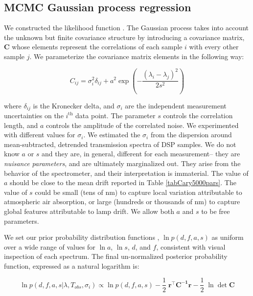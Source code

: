 \documentclass[osajnl,twocolumn,showpacs,superscriptaddress,11pt]{revtex4-1} %
\begin{document}
\subsection{MCMC Gaussian process regression}

We constructed the likelihood function \cite{2013sdmm.book.....I}.  The Gaussian process takes into account the unknown but finite covariance structure by introducing a covariance matrix, $\boldsymbol{C}$ whose elements represent the correlations of each sample $i$ with every other sample $j$.  We parameterize the covariance matrix elements in the following way:

\begin{equation}
	C_{ij} = \sigma^2_{i}\delta_{ij}+a^2\exp{(-\frac{(\lambda_i-\lambda_j)^2}{2s^2})} \label{eqnGPkernel}
\end{equation}

where $\delta_{ij}$ is the Kronecker delta, and $\sigma_i$ are the independent measurement uncertainties on the $i^{\mathrm{th}}$ data point. The parameter $s$ controls the correlation length, and $a$ controls the amplitude of the correlated noise.  We experimented with different values for $\sigma_i$.  We estimated the $\sigma_i$ from the dispersion around mean-subtracted, detrended transmission spectra of DSP samples.  We do not know $a$ or $s$ and they are, in general, different for each measurement-- they are \emph{nuisance parameters}, and are ultimately marginalized out.  They arise from the behavior of the spectrometer, and their interpretation is immaterial.  The value of $a$ should be close to the mean drift reported in Table \ref{tabCary5000pars}.  The value of $s$ could be small (tens of nm) to capture local variation attributable to atmospheric air absorption, or large (hundreds or thousands of nm) to capture global features attributable to lamp drift.  We allow both $a$ and $s$ to be free parameters.

We set our prior probability distribution functions \cite{2013sdmm.book.....I}, $\ln{p(d,f,a,s)}$ as uniform over a wide range of values for $\ln{a}$, $\ln{s}$, $d$, and $f$, consistent with visual inspection of each spectrum.  The final un-normalized posterior probability function, expressed as a natural logarithm is:

\begin{equation}
	\ln{p(d,f,a,s|\lambda, T_{obs}, \sigma_i)} \propto \ln{p(d,f,a,s)} -\frac{1}{2}\;\boldsymbol{r^\intercal}\boldsymbol{C^{-1}}\boldsymbol{r} -\frac{1}{2}\;\ln{\det{\boldsymbol{C}}} \label{eqnPosterior}
\end{equation}
\end{document}
